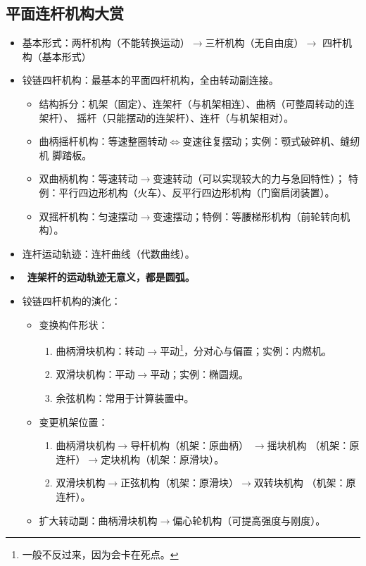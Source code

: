 \documentclass[12pt,a4paper]{article}
\newcommand{\tightlist}{\setlength{\parskip}{0pt}\setlength{\itemsep}{0pt}}
\newcommand{\hint}[1]{\textsf{（#1）}}
\newcommand{\minor}[1]{{\color{gray} #1}}
\newcommand{\then}{$\to$}
\newcommand{\equv}{$\Leftrightarrow$}
\renewcommand{\emph}[1]{\faIcon[regular]{lightbulb}\ \textbf{#1}}
\begin{document}
\subsection{平面连杆机构大赏}
\begin{itemize}\tightlist
    \item 基本形式：两杆机构\hint{不能转换运动}\then 三杆机构\hint{无自由度}\then
    四杆机构\hint{基本形式}
    \item 铰链四杆机构：最基本的平面四杆机构，全由转动副连接。
    \begin{itemize}\tightlist
        \item 结构拆分：机架\hint{固定}、连架杆\hint{与机架相连}、曲柄\hint{可整周转动的连架杆}、
        摇杆\hint{只能摆动的连架杆}、连杆\hint{与机架相对}。
        \item 曲柄摇杆机构：等速整圈转动\equv 变速往复摆动；实例：颚式破碎机、缝纫机
        脚踏板。
        \item 双曲柄机构：等速转动\then 变速转动\hint{可以实现较大的力与急回特性}；
        特例：平行四边形机构\hint{火车}、反平行四边形机构\hint{门窗启闭装置}。
        \item 双摇杆机构：匀速摆动\then 变速摆动；特例：等腰梯形机构\hint{前轮转向机构}。
    \end{itemize}
    \item 连杆运动轨迹：连杆曲线\hint{代数曲线}。
    \item \emph{连架杆的运动轨迹无意义，都是圆弧。}
    \item 铰链四杆机构的演化：
    \begin{itemize}\tightlist
        \item 变换构件形状：
        \begin{enumerate}\tightlist
            \item 曲柄滑块机构：转动\then 平动\footnote{一般不反过来，因为会卡在死点。
            }，分对心与偏置；实例：内燃机。
            \item 双滑块机构：平动\then 平动；实例：椭圆规。
            \item \minor{余弦机构：常用于计算装置中。}
        \end{enumerate}
        \item 变更机架位置：
        \begin{enumerate}\tightlist
            \item 曲柄滑块机构\then 导杆机构\hint{机架：原曲柄}\minor{\then 摇块机构
            \hint{机架：原连杆}\then 定块机构\hint{机架：原滑块}}。
            \item \minor{双滑块机构\then 正弦机构\hint{机架：原滑块}\then 双转块机构
            \hint{机架：原连杆}。}
        \end{enumerate}
        \item 扩大转动副：曲柄滑块机构\then 偏心轮机构\hint{可提高强度与刚度}。
    \end{itemize}
\end{itemize}
\end{document}
